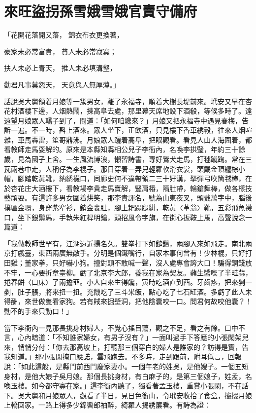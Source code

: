 %

\chapter{來旺盜拐孫雪娥\KG 雪娥官賣守備府}


\begin{showcontents}{}



「花開花落開又落，  錦衣布衣更換著，

豪家未必常富貴，  貧人未必常寂寞；

扶人未必上青天，  推人未必填溝壑，

勸君凡事莫怨天，  天意與人無厚薄。」

話說吳大舅領着月娘等一簇男女，離了永福寺，順着大樹長堤前來。玳安又早在杏花村酒樓下邊，人烟熱鬧，揀高阜去處，那里幕天席地設下酒殽，等候多時了。遠遠望月娘眾人轎子到了，問道：「如何咱纔來？」月娘又把永福寺中遇見春梅，告訴一遍。不一時，斟上酒來。眾人坐下，正飲酒，只見樓下香車綉轂，往來人烟喧雜，車馬轟雷，笙哥鼎沸。月娘眾人躧着高阜，把眼觀看。看見人山人海圍着，都看教師走馬耍解的。原來是本縣知縣相公兒子李衙內，名喚李拱璧，年約三十餘歲，見為國子上舍。一生風流博浪，懶習詩書，專好鶯犬走馬，打毬蹴踘。常在三瓦兩巷中走，人稱仔為李棍子。那日穿着一弄兒輕羅軟滑衣裳，頭戴金頂纏棕小帽，腳踏乾黃靴，納綉襪口，同廊史何不違帶領二三十好漢，拏彈弓吹筒毬棒，在於杏花庄大酒樓下，看教場李貴走馬賣解，豎肩椿，隔肚帶，輪鎗舞棒，做各樣技藝頑耍。有這許多男女圍着烘笑，那李貴諢名，號為山東夜叉，頭戴萬字中，腦後撲匾金環，身穿紫窄衫，銷金裹肚，腳上耙蹋腿絣，乾黃〈革翁〉靴，五彩飛魚襪口，坐下銀鬃馬，手執朱紅桿明鎗，頭招風令字旗，在街心扳鞍上馬，高聲說念一篇道：

「我做教師世罕有，江湖遠近揚名久。雙拳打下如鎚鑽，兩腳入來如飛走。南北兩京打戲臺，東西兩廣無敵手。分明是個鐵嘴行，自家本事何曾有！少林棍，只好打田雞；董家拳，只好嚇小狗。撞對頭不敢喊一聲，沒人處專會誇大口！騙得銅錢放不牢，一心要折章臺柳。虧了北京李大郎，養我在家為契友。蘸生醬喫了半畦蒜，捲春餅〈口床〉了兩擔韮。小人自來生得饞，寅時吃酒直到酉。牙齒疼，把來剉一剉，肚子脹，將來扭一扭。充饑吃了三斗米飯，點心吃了七石缸酒。多虧了此人未得酬，來世做隻看家狗。若有賊來掘壁洞，把他陰囊咬一口。問君何故咬他囊？！動不的手來只動口！」

當下李衙內一見那長挑身材婦人，不覺心搖目蕩，觀之不足，看之有餘。口中不言，心內暗道：「不知誰家婦女，有男子沒有？」一面叫過手下答應的小張閑架兒來，悄悄分付：「你去那高坡上，打聽那三個穿白的婦人是誰家的？訪得是實，告我知道。」那小張閑掩口應諾，雲飛跑去。不多時，走到跟前，附耳低言，回報說：「如此這般，是縣門前西門慶家妻小。一個年老的姓吳，是他嫂子。一個五短身材，是他大娘子吳月娘。那個長挑身材，有白麻子的，是第三個娘子，姓孟，名喚玉樓。如今都守寡在家。」這李衙內聽了，獨看著孟玉樓，重賞小張閑，不在話下。吳大舅和月娘眾人，觀看了半日，見日色銜山，令玳安收拾了食盒，攛掇月娘上轎回家。一路上得多少錦轡郎袖醉，綺羅人揭綉簾看。有詩為證：


\end{showcontents}
